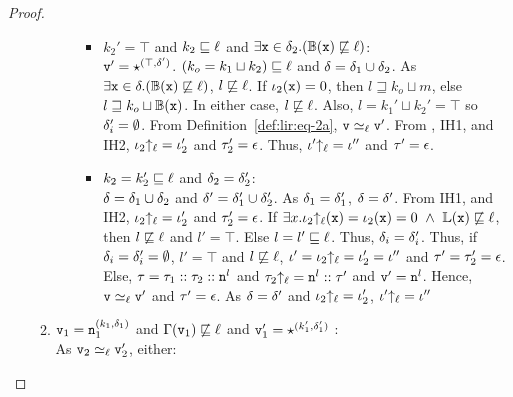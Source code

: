 \begin{proof}
\begin{itemize}[leftmargin=.5in]
\begin{enumerate}
\begin{enumerate}
\begin{itemize}
        \item $k_2' = \top$ and $k_2 \sqsubseteq \ell$ and
          $\exists \texttt{x} \in \delta_2. (\mathbb{B}(\texttt{x}) \not\sqsubseteq \ell)$: \\
          $\texttt{v}' = \star^{(\top, \delta')}$. $(k_o = k_1 \sqcup k_2) \sqsubseteq
          \ell$ and $\delta = \delta_1 \cup \delta_2$. As $\exists
          \texttt{x} \in \delta.(\mathbb{B}(\texttt{x}) \not\sqsubseteq \ell)$, $l
          \not\sqsubseteq \ell$. If
          $\iota_2(\texttt{x}) =0$, then $l \sqsupseteq k_o \sqcup m$, else $l
          \sqsupseteq k_o \sqcup \mathbb{B}(\texttt{x})$. In either case, $l
          \not\sqsubseteq \ell$. Also, $l = k_1' \sqcup k_2' =
          \top$ so $\delta_i' = \emptyset$. From
          Definition~\ref{def:lir:eq-2a}, $\texttt{v} \simeq_\ell \texttt{v}'$. From 
          , IH1, and IH2, $\iota_2{\uparrow_\ell} = \iota_2'$ and
          $\tau_2' = \epsilon$. Thus, $\iota'{\uparrow_\ell} = \iota''$ and
          $\tau' = \epsilon$.

        \item $k_2 = k_2' \sqsubseteq \ell$ and $
          \delta_2 = \delta_2'$: \\
          $\delta = \delta_1 \cup \delta_2$ and $\delta' = \delta_1' \cup \delta_2'$. 
          As $\delta_1 = \delta_1'$, $ \delta = \delta'$. From
          IH1, and IH2, $\iota_2{\uparrow_\ell} = \iota_2'$ and
          $\tau_2' = \epsilon$. If $\exists x. \iota_2{\uparrow_\ell}(\texttt{x}) =
          \iota_2(\texttt{x}) = 0 ~\wedge~\mathbb{L}(\texttt{x}) \not\sqsubseteq \ell$, then
          $l \not\sqsubseteq \ell$ and $l' = \top$. Else $l = l'
          \sqsubseteq \ell$. Thus, $\delta_i = \delta_i'$. Thus,
          if $\delta_i = \delta_i' = \emptyset$, $l' = \top$ and $l
          \not\sqsubseteq \ell$, $\iota' = \iota_2{\uparrow_\ell} =
          \iota_2' = \iota''$ and $\tau' = \tau_2' =
          \epsilon$. Else, $\tau = 
          \tau_1::\tau_2::\texttt{n}^l$ and $\tau_2{\uparrow_\ell} = \texttt{n}^l::\tau'$
          and $\texttt{v}' = \texttt{n}^l$. Hence, $\texttt{v} \simeq_\ell \texttt{v}'$ and $\tau'
          = \epsilon$. As $\delta = \delta'$ and
          $\iota_2{\uparrow_\ell} = \iota_2'$, $\iota'{\uparrow_\ell} = \iota''$
        \end{itemize}
      \end{enumerate}

    \item $\texttt{v}_1 = \texttt{n}_1^{(k_1, \delta_1)}$ and $\Gamma(\texttt{v}_1) \not\sqsubseteq
      \ell$ and  $\texttt{v}_1' = \star^{(k_1',\delta_1')}$ : \\
      As $\texttt{v}_2 \simeq_\ell \texttt{v}_2'$, either: 


\end{enumerate}
\end{itemize}
\end{proof}
